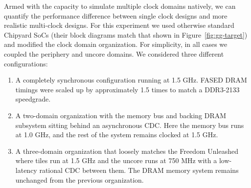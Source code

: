 Armed with the capacity to simulate multiple clock domains natively, we can
quantify the performance difference between single clock designs and more
realistic multi-clock designs. For this experiment we used otherwise standard
Chipyard SoCs (their block diagrams match that shown in
Figure~\ref{fig:gg-target}) and modified the clock domain organization. For
simplicity, in all cases we coupled the periphery and uncore domains.
We considered three different configurations:

\begin{enumerate}
    \item A completely synchronous configuration running at 1.5 GHz. FASED DRAM timings were scaled up
        by approximately 1.5 times to match a DDR3-2133 speedgrade.
    \item A two-domain organization with the memory bus and backing DRAM subsystem sitting behind
        an asynchronous CDC. Here the memory bus runs at 1.0 GHz, and the rest of the system
        remains clocked at 1.5 GHz.
    \item A three-domain organization that loosely matches the Freedom
        Unleashed where tiles run at 1.5 GHz and the uncore runs at 750 MHz
        with a low-latency rational CDC between them. The DRAM memory
        system remains unchanged from the previous organization.
\end{enumerate}


